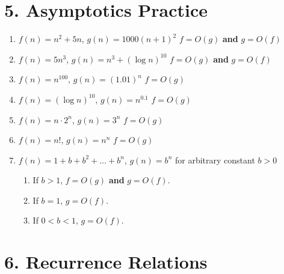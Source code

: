 \documentclass[11pt]{article}
\newenvironment{qparts}{\begin{enumerate}[{(}a{)}]}{\end{enumerate}}
\begin{document}
\newpage
\section*{5. Asymptotics Practice}

\begin{enumerate}

\item 
\( f(n) = n^2 + 5n \), \( g(n) = 1000(n+1)^2 \)
   \rightarrow \( f = O(g) \) \textbf{ and } \( g = O(f) \)

\item 
\( f(n) = 5n^3 \), \( g(n) = n^3 + (\log n)^{10} \)
   \rightarrow \( f = O(g) \) \textbf{ and } \( g = O(f) \)

\item 
\( f(n) = n^{100} \), \( g(n) = (1.01)^n \)
   \rightarrow \( f = O(g) \)

\item 
\( f(n) = (\log n)^{10} \), \( g(n) = n^{0.1} \)
   \rightarrow \( f = O(g) \)

\item 
\( f(n) = n \cdot 2^n \), \( g(n) = 3^n \)
   \rightarrow \( f = O(g) \)

\item 
\( f(n) = n! \), \( g(n) = n^n \)
   \rightarrow \( f = O(g) \)

\item 
\( f(n) = 1 + b + b^2 + \dots + b^n \), \( g(n) = b^n \) for arbitrary constant \( b > 0 \)
\begin{qparts}
\item If \( b > 1 \), \( f = O(g) \) \textbf{and} \( g = O(f) \).
\item If \( b = 1 \), \( g = O(f) \).
\item If \( 0 < b < 1 \), \( g = O(f) \).
\end{qparts}

\end{enumerate}



\newpage
\section*{6. Recurrence Relations}
\end{document}
